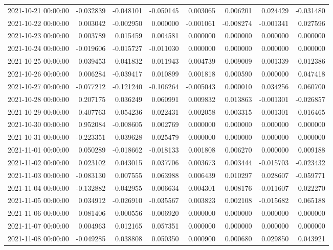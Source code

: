 \begin{tabular}{lrrrrrrr}
2021-10-21 00:00:00 & -0.032839 & -0.048101 & -0.050145 & 0.003065 & 0.006201 & 0.024429 & -0.031480 \\
2021-10-22 00:00:00 & 0.003042 & -0.002950 & 0.000000 & -0.001061 & -0.008274 & -0.001341 & 0.027596 \\
2021-10-23 00:00:00 & 0.003789 & 0.015459 & 0.004581 & 0.000000 & 0.000000 & 0.000000 & 0.000000 \\
2021-10-24 00:00:00 & -0.019606 & -0.015727 & -0.011030 & 0.000000 & 0.000000 & 0.000000 & 0.000000 \\
2021-10-25 00:00:00 & 0.039453 & 0.041832 & 0.011943 & 0.004739 & 0.009009 & 0.001339 & -0.012386 \\
2021-10-26 00:00:00 & 0.006284 & -0.039417 & 0.010899 & 0.001818 & 0.000590 & 0.000000 & 0.047418 \\
2021-10-27 00:00:00 & -0.077212 & -0.121240 & -0.106264 & -0.005043 & 0.000010 & 0.034256 & 0.060700 \\
2021-10-28 00:00:00 & 0.207175 & 0.036249 & 0.060991 & 0.009832 & 0.013863 & -0.001301 & -0.026857 \\
2021-10-29 00:00:00 & 0.407763 & 0.054236 & 0.022431 & 0.002058 & 0.003315 & -0.001301 & -0.016465 \\
2021-10-30 00:00:00 & 0.952084 & -0.008605 & 0.002769 & 0.000000 & 0.000000 & 0.000000 & 0.000000 \\
2021-10-31 00:00:00 & -0.223351 & 0.039628 & 0.025479 & 0.000000 & 0.000000 & 0.000000 & 0.000000 \\
2021-11-01 00:00:00 & 0.050289 & -0.018662 & -0.018133 & 0.001808 & 0.006270 & 0.000000 & 0.009188 \\
2021-11-02 00:00:00 & 0.023102 & 0.043015 & 0.037706 & 0.003673 & 0.003444 & -0.015703 & -0.023432 \\
2021-11-03 00:00:00 & -0.083130 & 0.007555 & 0.063988 & 0.006439 & 0.010297 & 0.028607 & -0.059771 \\
2021-11-04 00:00:00 & -0.132882 & -0.042955 & -0.006634 & 0.004301 & 0.008176 & -0.011607 & 0.022270 \\
2021-11-05 00:00:00 & 0.034912 & -0.026910 & -0.035567 & 0.003823 & 0.002108 & -0.015682 & 0.065188 \\
2021-11-06 00:00:00 & 0.081406 & 0.000556 & -0.006920 & 0.000000 & 0.000000 & 0.000000 & 0.000000 \\
2021-11-07 00:00:00 & 0.004963 & 0.012165 & 0.057351 & 0.000000 & 0.000000 & 0.000000 & 0.000000 \\
2021-11-08 00:00:00 & -0.049285 & 0.038808 & 0.050350 & 0.000900 & 0.000680 & 0.029850 & 0.043921 \\

\end{tabular}
